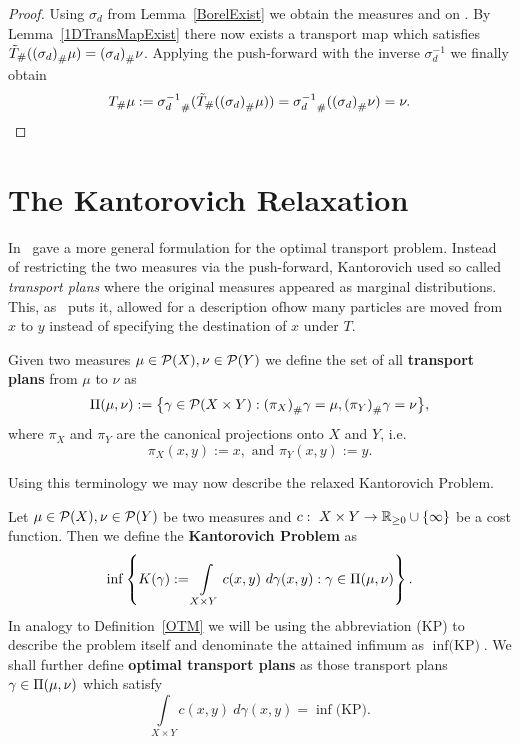 \begin{proof}
	Using $\sigma_d$ from Lemma~\ref{BorelExist} we obtain the measures \push[(\sigma_d)]{\mu} and \push[(\sigma_d)]{\nu} on \R. By Lemma~\ref{1DTransMapExist} there now exists a transport map \map[\tilde{T}]{\R}{\R} which satisfies $\push[\tilde{T}]{(\push[(\sigma_d)]{\mu})} = \push[(\sigma_d)]{\nu}$. Applying the push-forward with the inverse $\sigma_d^{-1}$ we finally obtain
	\[ \push{\mu} := \push[\sigma_d^{-1}]{(\push[\tilde{T}]{(\push[(\sigma_d)]{\mu})})} = \push[\sigma_d^{-1}]{(\push[(\sigma_d)]{\nu})} = \nu. \]
\end{proof}

\section{The Kantorovich Relaxation}\label{KantRelax}
In~\cite{Kan1942} gave a more general formulation for the optimal transport problem. Instead of restricting the two measures via the push-forward, Kantorovich used so called \textit{transport plans} where the original measures appeared as marginal distributions. This, as~\cite{San2015} puts it,  allowed for a description ofhow many particles are moved from $x$ to $y$ instead of specifying the destination of $x$ under $T$.

\begin{definition}\label{TransPlans}
	Given two measures $\mu \in \PM{X}, \nu \in \PM{Y}$ we define the set of all \textbf{transport plans} from $\mu$ to $\nu$ as
	\[ \TP{\mu}{\nu} := \big\{ \gamma \in \PM{X \times Y} : \push[(\pi_X)]{\gamma} = \mu, \push[(\pi_Y)]{\gamma} = \nu \big\}, \]
	where $\pi_X$ and $\pi_Y$ are the canonical projections onto $X$ and $Y$, i.e.
	\[ \pi_X(x, y) := x, \text{ and } \pi_Y(x, y) := y. \]
\end{definition}

Using this terminology we may now describe the relaxed Kantorovich Problem.

\begin{definition}\label{KanProb}
	Let $\mu \in \PM{X}, \nu \in \PM{Y}$ be two measures and $\map[c]{X \times Y}{\RZero \cup \{\infty\}}$ be a cost function. Then we define the \textbf{Kantorovich Problem} as
	\begin{equation}\label{KP}
		\inf \left\{ K(\gamma) := \int\limits_{X \times Y} c(x, y)~d\gamma(x, y) : \gamma \in \TP{\mu}{\nu} \right\}.
	\end{equation}
	In analogy to Definition~\ref{OTM} we will be using the abbreviation (KP) to describe the problem itself and denominate the attained infimum as $\inf \text{(KP)}$. We shall further define \textbf{optimal transport plans} as those transport plans $\gamma \in \TP{\mu}{\nu}$ which satisfy
	\[ \int\limits_{X \times Y} c(x, y)~d\gamma(x, y) = \inf \text{(KP)}. \]
\end{definition}

